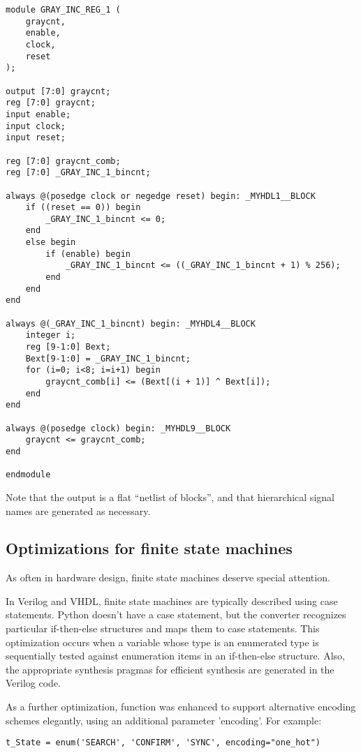 \documentclass{howto}
\begin{document}
\begin{verbatim}
module GRAY_INC_REG_1 (
    graycnt,
    enable,
    clock,
    reset
);

output [7:0] graycnt;
reg [7:0] graycnt;
input enable;
input clock;
input reset;

reg [7:0] graycnt_comb;
reg [7:0] _GRAY_INC_1_bincnt;

always @(posedge clock or negedge reset) begin: _MYHDL1__BLOCK
    if ((reset == 0)) begin
        _GRAY_INC_1_bincnt <= 0;
    end
    else begin
        if (enable) begin
            _GRAY_INC_1_bincnt <= ((_GRAY_INC_1_bincnt + 1) % 256);
        end
    end
end

always @(_GRAY_INC_1_bincnt) begin: _MYHDL4__BLOCK
    integer i;
    reg [9-1:0] Bext;
    Bext[9-1:0] = _GRAY_INC_1_bincnt;
    for (i=0; i<8; i=i+1) begin
        graycnt_comb[i] <= (Bext[(i + 1)] ^ Bext[i]);
    end
end

always @(posedge clock) begin: _MYHDL9__BLOCK
    graycnt <= graycnt_comb;
end

endmodule
\end{verbatim}

Note that the output is a flat ``netlist of blocks'', and
that hierarchical signal names are generated as necessary.

\subsection{Optimizations for finite state machines}
As often in hardware design, finite state machines deserve special attention.

In Verilog and VHDL, finite state machines are typically described
using case statements.  Python doesn't have a case statement, but the
converter recognizes particular if-then-else structures and maps them
to case statements. This optimization occurs when a variable whose
type is an enumerated type is sequentially tested against enumeration
items in an if-then-else structure. Also, the appropriate synthesis
pragmas for efficient synthesis are generated in the Verilog code.

As a further optimization, function  was enhanced to support
alternative encoding schemes elegantly, using an additional parameter
'encoding'. For example:

\begin{verbatim}
t_State = enum('SEARCH', 'CONFIRM', 'SYNC', encoding="one_hot")
\end{verbatim}
\end{document}
